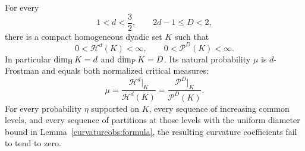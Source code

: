 \begin{theorem}\label{curvatureobs:criticalsets}
For every
\[
 1<d<\frac32,\qquad 2d-1\le D<2,
\]
there is a compact homogeneous dyadic set \(K\) such that
\[
 0<\mathcal H^d(K)<\infty,\qquad
 0<\mathcal P^D(K)<\infty.
\]
In particular \(\dim_{\mathrm H} K=d\) and \(\dim_{\mathrm P} K=D\). Its natural probability
\(\mu\) is \(d\)-Frostman and equals both normalized critical measures:
\begin{equation}\label{curvatureobs:criticalmeasures}
 \mu=\frac{\mathcal H^d|_K}{\mathcal H^d(K)}
     =\frac{\mathcal P^D|_K}{\mathcal P^D(K)}.
\end{equation}
For every probability \(\eta\) supported on \(K\), every sequence
of increasing common levels, and every sequence of partitions at
those levels with the uniform diameter bound in
Lemma~\ref{curvatureobs:formula}, the resulting curvature coefficients
fail to tend to zero.
\end{theorem}
